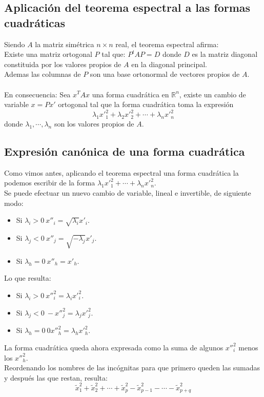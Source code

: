 \documentclass[10pt]{article}
\theoremstyle{definition}
\begin{document}
\subsection{Aplicación del teorema espectral a las formas cuadráticas}
Siendo $A$ la matriz simétrica $n\times n$ real, el teorema espectral afirma:\\
Existe una matriz ortogonal $P$ tal que: $P^tAP=D$ donde $D$ es la matriz diagonal constituida por los valores propios de $A$ en la diagonal principal.\\Ademas las columnas de $P$ son una base ortonormal de vectores propios de $A$.
\\\\En consecuencia: Sea $x^TAx$ una forma cuadrática en $\mathbb{R}^n$, existe un cambio de variable $x=Px'$ ortogonal tal que la forma cuadrática toma la expresión $$\lambda_1x'^2_1+\lambda_2x'^2_2+\cdots+\lambda_nx'^2_n$$ donde $\lambda_1,\cdots,\lambda_n$ son los valores propios de $A$.
\newpage\subsection{Expresión canónica de una forma cuadrática}
Como vimos antes, aplicando el teorema espectral una forma cuadrática la podemos escribir de la forma $\lambda_1x'^2_1+\cdots+\lambda_nx'^2_n$.\\
Se puede efectuar un nuevo cambio de variable, lineal e invertible, de siguiente modo:
\begin{itemize}
    \item Si $\lambda_i>0\ x''_i=\sqrt{\lambda_i}x'_i$.
    \item Si $\lambda_j<0\ x''_j=\sqrt{-\lambda_j}x'_j$.
    \item Si $\lambda_h=0\ x''_h=x'_h$.
\end{itemize}
Lo que resulta:
\begin{itemize}
    \item Si $\lambda_i>0\ x''^2_i=\lambda_ix'^2_i$.
    \item Si $\lambda_j<0\ -x''^2_j=\lambda_jx'^2_j$.
    \item Si $\lambda_h=0\ 0x''^2_h=\lambda_hx'^2_h$.
\end{itemize}
La forma cuadrática queda ahora expresada como la suma de algunos $x''^2_i$ menos los $x''^2_h$.
\\Reordenando los nombres de las incógnitas para que primero queden las sumadas y después las que restan, resulta: $$\tilde{x}_{1}^{2} +\tilde{x}_{2}^{2} +\cdots +\tilde{x}_{p}^{2} -\tilde{x}_{p-1}^{2} -\cdots -\tilde{x}_{p+q}^{2}$$
\end{document}
